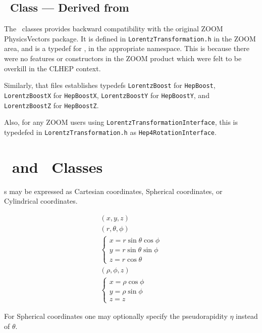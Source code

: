 \subsection{\protect\LTs\ Class --- Derived from \LT }

The \LT\ classes provides backward compatibility 
with the original ZOOM PhysicsVectors package.  
It is defined in {\tt LorentzTransformation.h} in the ZOOM area, and
is a typedef for \LT, in the appropriate namespace.
This is because there were no features or constructors in the ZOOM 
product which were felt to be overkill in the CLHEP context.  

Similarly, that files establishes typedefs 
{\tt LorentzBoost} for {\tt HepBoost}, 
{\tt LorentzBoostX} for {\tt HepBoostX}, 
{\tt LorentzBoostY} for {\tt HepBoostY}, and  
{\tt LorentzBoostZ} for {\tt HepBoostZ}. 

Also, for any ZOOM users using {\tt LorentzTransformationInterface},
this is typedefed in {\tt LorentzTransformation.h} as 
{\tt Hep4RotationInterface}.

\newpage
\section{\protect\SV\ and \protect\SVz\ Classes}

\SV s may be expressed as Cartesian coordinates, Spherical coordinates,
or Cylindrical coordinates.

\begin{eqnarray}
  ( x, y, z ) \label{eq:cartesian}\\
  ( r, \theta, \phi ) \nonumber \\
  \left\{
  \begin{array}{r}
  x = r \sin \theta \cos \phi \\
  y = r \sin \theta \sin \phi \\
  z = r \cos \theta \label{eq:polar}
  \end{array}
  \right. \\
  ( \rho, \phi, z ) \nonumber \\
  \left\{
  \begin{array}{r}
  x = \rho \cos \phi \\
  y = \rho \sin \phi \\
  z = z \label{eq:cylindrical}
  \end{array}
  \right.
\end{eqnarray}

For Spherical coordinates one may optionally
specify the pseudorapidity $\eta$ instead of $\theta$.

